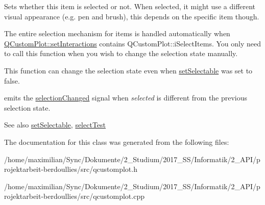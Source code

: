 Sets whether this item is selected or not. When selected, it might use a different visual appearance (e.\+g. pen and brush), this depends on the specific item though.

The entire selection mechanism for items is handled automatically when \hyperlink{class_q_custom_plot_a5ee1e2f6ae27419deca53e75907c27e5}{Q\+Custom\+Plot\+::set\+Interactions} contains Q\+Custom\+Plot\+::i\+Select\+Items. You only need to call this function when you wish to change the selection state manually.

This function can change the selection state even when \hyperlink{class_q_c_p_abstract_item_a8a8e32a55bc478b849756a78c2d87fd2}{set\+Selectable} was set to false.

emits the \hyperlink{class_q_c_p_abstract_item_aa5cffb034fc65dbb91c77e02c1c14251}{selection\+Changed} signal when {\itshape selected} is different from the previous selection state.

\begin{DoxySeeAlso}{See also}
\hyperlink{class_q_c_p_abstract_item_a8a8e32a55bc478b849756a78c2d87fd2}{set\+Selectable}, \hyperlink{class_q_c_p_abstract_item_ae41d0349d68bb802c49104afd100ba2a}{select\+Test} 
\end{DoxySeeAlso}


The documentation for this class was generated from the following files\+:\begin{DoxyCompactItemize}
\item 
/home/maximilian/\+Sync/\+Dokumente/2\+\_\+\+Studium/2017\+\_\+\+S\+S/\+Informatik/2\+\_\+\+A\+P\+I/projektarbeit-\/berdoullies/src/qcustomplot.\+h\item 
/home/maximilian/\+Sync/\+Dokumente/2\+\_\+\+Studium/2017\+\_\+\+S\+S/\+Informatik/2\+\_\+\+A\+P\+I/projektarbeit-\/berdoullies/src/qcustomplot.\+cpp\end{DoxyCompactItemize}
